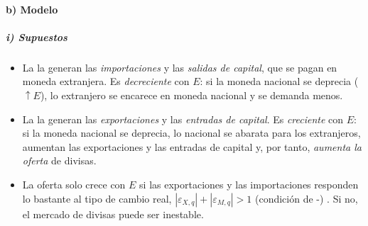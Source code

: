 \documentclass[11pt]{article}
\begin{document}
\paragraph{b) Modelo}
\subparagraph{i) Supuestos}
\begin{itemize}
\item La  la generan las \emph{importaciones} y las \emph{salidas de capital}, que se pagan en moneda extranjera. Es \emph{decreciente} con $E$: si la moneda nacional se deprecia ($\uparrow E$), lo extranjero se encarece en moneda nacional y se demanda menos.
\item La  la generan las \emph{exportaciones} y las \emph{entradas de capital}. Es \emph{creciente} con $E$: si la moneda nacional se deprecia, lo nacional se abarata para los extranjeros, aumentan las exportaciones y las entradas de capital y, por tanto, \emph{aumenta la oferta} de divisas.
\item La oferta solo crece con $E$ si las exportaciones y las importaciones responden lo bastante al tipo de cambio real, $|\varepsilon_{X,q}|+|\varepsilon_{M,q}|>1$ (condición de -) . Si no, el mercado de divisas puede ser inestable.
\end{itemize}
\end{document}
